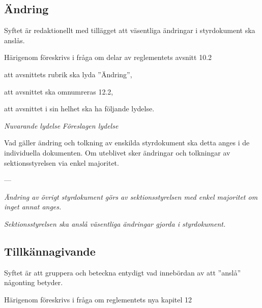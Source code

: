 \documentclass{article}
\newenvironment{lydelse}
    {\begin{paracol}{2}%
        \emph{Nuvarande lydelse}%
        \switchcolumn%
        \emph{Föreslagen lydelse}%
    \end{paracol}%
    \begin{enumerate}[label=\thesubsection.\arabic*]%
    \begin{paracol}{2}%
    }{\end{paracol}\end{enumerate}}
\begin{document}
\subsection{Ändring}
Syftet är redaktionellt med tillägget att väsentliga ändringar i styrdokument ska anslås.

Härigenom föreskrivs i fråga om delar av reglementets avsnitt 10.2

\begin{dels}
    \item att avsnittets rubrik ska lyda ''Ändring'',
    \item att avsnittet ska omnumreras 12.2,
    \item att avsnittet i sin helhet ska ha följande lydelse.
\end{dels}
\begin{lydelse}
    \setcounter{section}{10}
    \setcounter{subsection}{2}
    
    \item Vad gäller ändring och tolkning av enskilda styrdokument ska detta anges i de individuella dokumenten. Om uteblivet sker ändringar och tolkningar av sektionsstyrelsen via enkel majoritet.
    
    \item[] ---
    
    \setcounter{section}{12}
    \setcounter{subsection}{2}
    \switchcolumn
  
    \item \emph{Ändring av övrigt styrdokument görs av sektionsstyrelsen med enkel majoritet om inget annat anges.}

    \item[]
    \item \emph{Sektionsstyrelsen ska anslå väsentliga ändringar gjorda i styrdokument.}

\end{lydelse}
\subsection{Tillkännagivande}
\label{R:Tillkannagivande}
Syftet är att gruppera och beteckna entydigt vad innebördan av att ''anslå'' någonting betyder.

Härigenom föreskrivs i fråga om reglementets nya kapitel 12
\end{document}
